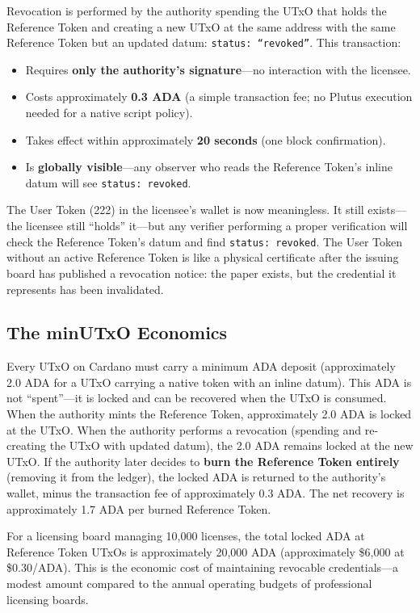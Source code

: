 Revocation is performed by the authority spending the UTxO that holds the Reference Token and creating a new UTxO at the same address with the same Reference Token but an updated datum: \texttt{status: ``revoked''}. This transaction:

\begin{itemize}[nosep]
  \item Requires \textbf{only the authority's signature}---no interaction with the licensee.
  \item Costs approximately \textbf{0.3 ADA} (a simple transaction fee; no Plutus execution needed for a native script policy).
  \item Takes effect within approximately \textbf{20 seconds} (one block confirmation).
  \item Is \textbf{globally visible}---any observer who reads the Reference Token's inline datum will see \texttt{status: revoked}.
\end{itemize}

The User Token (222) in the licensee's wallet is now meaningless. It still exists---the licensee still ``holds'' it---but any verifier performing a proper verification will check the Reference Token's datum and find \texttt{status: revoked}. The User Token without an active Reference Token is like a physical certificate after the issuing board has published a revocation notice: the paper exists, but the credential it represents has been invalidated.

\subsection{The minUTxO Economics}

Every UTxO on Cardano must carry a minimum ADA deposit (approximately 2.0 ADA for a UTxO carrying a native token with an inline datum). This ADA is not ``spent''---it is locked and can be recovered when the UTxO is consumed. When the authority mints the Reference Token, approximately 2.0 ADA is locked at the UTxO. When the authority performs a revocation (spending and re-creating the UTxO with updated datum), the 2.0 ADA remains locked at the new UTxO. If the authority later decides to \textbf{burn the Reference Token entirely} (removing it from the ledger), the locked ADA is returned to the authority's wallet, minus the transaction fee of approximately 0.3 ADA. The net recovery is approximately 1.7 ADA per burned Reference Token.

For a licensing board managing 10,000 licenses, the total locked ADA at Reference Token UTxOs is approximately 20,000 ADA (approximately \$6,000 at \$0.30/ADA). This is the economic cost of maintaining revocable credentials---a modest amount compared to the annual operating budgets of professional licensing boards.

